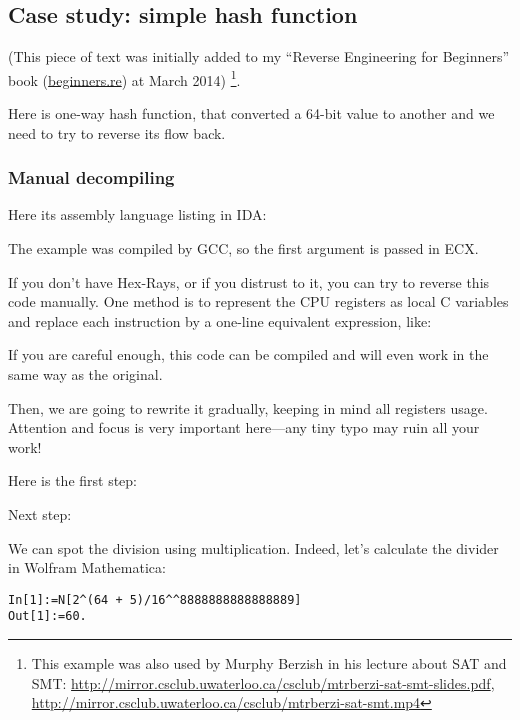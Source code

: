 \subsection{Case study: simple hash function}

(This piece of text was initially added to my ``Reverse Engineering for Beginners'' book (\url{beginners.re}) at March 2014)
\footnote{This example was also used by Murphy Berzish in his lecture about \ac{SAT} and \ac{SMT}:
\url{http://mirror.csclub.uwaterloo.ca/csclub/mtrberzi-sat-smt-slides.pdf},
\url{http://mirror.csclub.uwaterloo.ca/csclub/mtrberzi-sat-smt.mp4}}.

Here is one-way hash function, that converted a 64-bit value to another and we need to try to reverse its flow back.

\subsubsection{Manual decompiling}

Here its assembly language listing in IDA:



The example was compiled by GCC, so the first argument is passed in ECX.

If you don't have Hex-Rays, or if you distrust to it, you can try to reverse this code manually.
One method is to represent the CPU registers as local C variables and replace each instruction by
a one-line equivalent expression, like:



If you are careful enough, this code can be compiled and will even work in the same way as the original.

Then, we are going to rewrite it gradually, keeping in mind all registers usage.
Attention and focus is very important here---any tiny typo may ruin all your work!

Here is the first step:



Next step:



We can spot the division using multiplication.
Indeed, let's calculate the divider in Wolfram Mathematica:

\begin{lstlisting}[caption=Wolfram Mathematica]
In[1]:=N[2^(64 + 5)/16^^8888888888888889]
Out[1]:=60.
\end{lstlisting}

